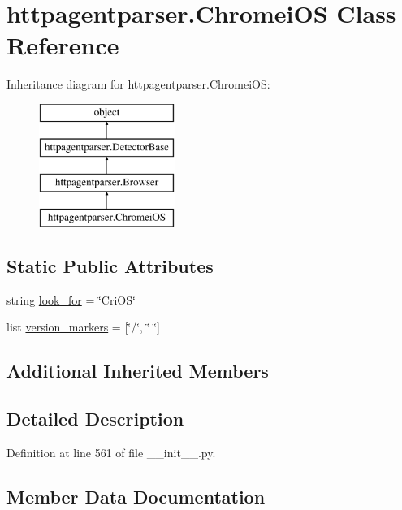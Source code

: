 \hypertarget{classhttpagentparser_1_1_chromei_o_s}{}\section{httpagentparser.\+Chromei\+OS Class Reference}
\label{classhttpagentparser_1_1_chromei_o_s}
Inheritance diagram for httpagentparser.\+Chromei\+OS\+:\begin{figure}[H]
\begin{center}
\leavevmode
\includegraphics[height=4.000000cm]{classhttpagentparser_1_1_chromei_o_s}
\end{center}
\end{figure}
\subsection*{Static Public Attributes}
\begin{DoxyCompactItemize}
\item 
string \hyperlink{classhttpagentparser_1_1_chromei_o_s_af2bfc1c3c828711ac5dff6e84541c045}{look\+\_\+for} = \char`\"{}Cri\+OS\char`\"{}
\item 
list \hyperlink{classhttpagentparser_1_1_chromei_o_s_a3be0f1cc89dd3a935d5583535cbe49ea}{version\+\_\+markers} = \mbox{[}\char`\"{}/\char`\"{}, \char`\"{} \char`\"{}\mbox{]}
\end{DoxyCompactItemize}
\subsection*{Additional Inherited Members}


\subsection{Detailed Description}


Definition at line 561 of file \+\_\+\+\_\+init\+\_\+\+\_\+.\+py.



\subsection{Member Data Documentation}
\hypertarget{classhttpagentparser_1_1_chromei_o_s_af2bfc1c3c828711ac5dff6e84541c045}{}\label{classhttpagentparser_1_1_chromei_o_s_af2bfc1c3c828711ac5dff6e84541c045} 
